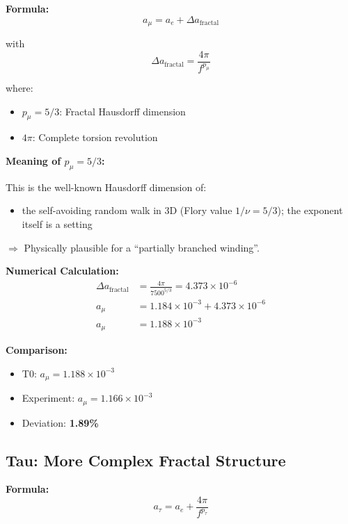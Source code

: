 	\textbf{Formula:}
	\begin{equation}
		a_\mu = a_e + \Delta a_{\text{fractal}}
		\label{eq:amu}
	\end{equation}
	
	with
	\begin{equation}
		\Delta a_{\text{fractal}} = \frac{4\pi}{f^{p_\mu}}
		\label{eq:delta_mu}
	\end{equation}
	
	where:
	\begin{itemize}
		\item $p_\mu = 5/3$: Fractal Hausdorff dimension
		\item $4\pi$: Complete torsion revolution
	\end{itemize}
	
	\textbf{Meaning of $p_\mu = 5/3$:}
	
	This is the well-known Hausdorff dimension of:
	\begin{itemize}
		\item the self-avoiding random walk in 3D (Flory value $1/\nu = 5/3$); the exponent itself is a setting
	\end{itemize}
	
	$\Rightarrow$ Physically plausible for a ``partially branched winding''.
	
	\textbf{Numerical Calculation:}
	\begin{align}
		\Delta a_{\text{fractal}} &= \frac{4\pi}{7500^{5/3}} = 4.373 \times 10^{-6} \\
		a_\mu &= 1.184 \times 10^{-3} + 4.373 \times 10^{-6} \\
		a_\mu &= 1.188 \times 10^{-3}
	\end{align}
	
	\textbf{Comparison:}
	\begin{itemize}
		\item T0: $a_\mu = 1.188 \times 10^{-3}$
		\item Experiment: $a_\mu = 1.166 \times 10^{-3}$
		\item Deviation: \textbf{1.89\%}
	\end{itemize}
	
	\subsection{Tau: More Complex Fractal Structure}
	
	\textbf{Formula:}
	\begin{equation}
		a_\tau = a_e + \frac{4\pi}{f^{p_\tau}}
		\label{eq:atau}
	\end{equation}
	
